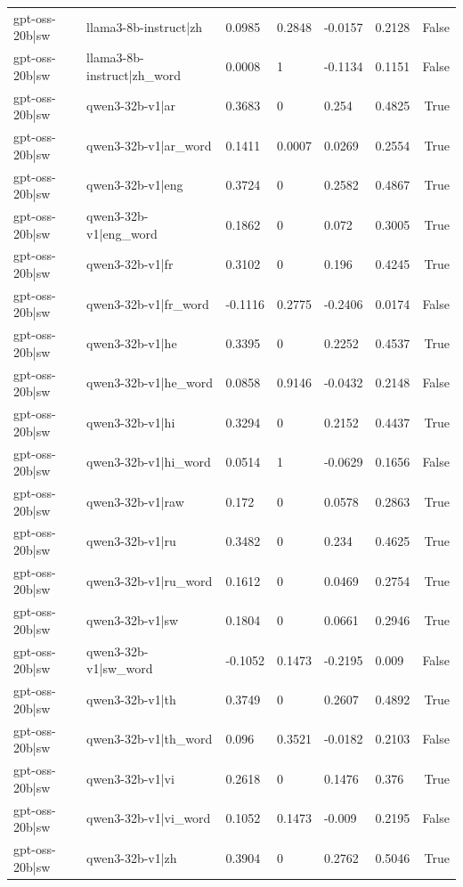\begin{table}
\begin{tabular}{llllllr}
gpt-oss-20b|sw & llama3-8b-instruct|zh & 0.0985 & 0.2848 & -0.0157 & 0.2128 & False \\
gpt-oss-20b|sw & llama3-8b-instruct|zh_word & 0.0008 & 1 & -0.1134 & 0.1151 & False \\
gpt-oss-20b|sw & qwen3-32b-v1|ar & 0.3683 & 0 & 0.254 & 0.4825 & True \\
gpt-oss-20b|sw & qwen3-32b-v1|ar_word & 0.1411 & 0.0007 & 0.0269 & 0.2554 & True \\
gpt-oss-20b|sw & qwen3-32b-v1|eng & 0.3724 & 0 & 0.2582 & 0.4867 & True \\
gpt-oss-20b|sw & qwen3-32b-v1|eng_word & 0.1862 & 0 & 0.072 & 0.3005 & True \\
gpt-oss-20b|sw & qwen3-32b-v1|fr & 0.3102 & 0 & 0.196 & 0.4245 & True \\
gpt-oss-20b|sw & qwen3-32b-v1|fr_word & -0.1116 & 0.2775 & -0.2406 & 0.0174 & False \\
gpt-oss-20b|sw & qwen3-32b-v1|he & 0.3395 & 0 & 0.2252 & 0.4537 & True \\
gpt-oss-20b|sw & qwen3-32b-v1|he_word & 0.0858 & 0.9146 & -0.0432 & 0.2148 & False \\
gpt-oss-20b|sw & qwen3-32b-v1|hi & 0.3294 & 0 & 0.2152 & 0.4437 & True \\
gpt-oss-20b|sw & qwen3-32b-v1|hi_word & 0.0514 & 1 & -0.0629 & 0.1656 & False \\
gpt-oss-20b|sw & qwen3-32b-v1|raw & 0.172 & 0 & 0.0578 & 0.2863 & True \\
gpt-oss-20b|sw & qwen3-32b-v1|ru & 0.3482 & 0 & 0.234 & 0.4625 & True \\
gpt-oss-20b|sw & qwen3-32b-v1|ru_word & 0.1612 & 0 & 0.0469 & 0.2754 & True \\
gpt-oss-20b|sw & qwen3-32b-v1|sw & 0.1804 & 0 & 0.0661 & 0.2946 & True \\
gpt-oss-20b|sw & qwen3-32b-v1|sw_word & -0.1052 & 0.1473 & -0.2195 & 0.009 & False \\
gpt-oss-20b|sw & qwen3-32b-v1|th & 0.3749 & 0 & 0.2607 & 0.4892 & True \\
gpt-oss-20b|sw & qwen3-32b-v1|th_word & 0.096 & 0.3521 & -0.0182 & 0.2103 & False \\
gpt-oss-20b|sw & qwen3-32b-v1|vi & 0.2618 & 0 & 0.1476 & 0.376 & True \\
gpt-oss-20b|sw & qwen3-32b-v1|vi_word & 0.1052 & 0.1473 & -0.009 & 0.2195 & False \\
gpt-oss-20b|sw & qwen3-32b-v1|zh & 0.3904 & 0 & 0.2762 & 0.5046 & True \\

\end{tabular}
\end{table}
